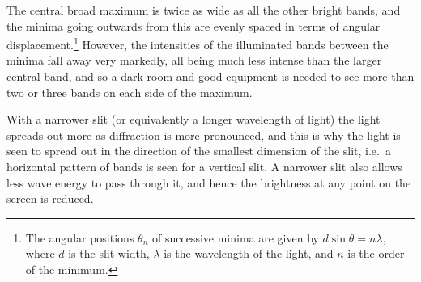 \noindent{}\hspace{0em}

The central broad maximum is twice as wide as all the other bright bands, and the minima going outwards from this are evenly spaced in terms of angular displacement.\footnote{The angular positions $\theta_{n}$ of successive minima are given by $d\sin\theta=n\lambda$, where $d$ is the slit width, $\lambda$ is the wavelength of the light, and $n$ is the order of the minimum.}  However, the intensities of the illuminated bands between the minima fall away very markedly, all being much less intense than the larger central band, and so a dark room and good equipment is needed to see more than two or three bands on each side of the maximum.  

With a narrower slit (or equivalently a longer wavelength of light) the light spreads out more as diffraction is more pronounced, and this is why the light is seen to spread out in the direction of the smallest dimension of the slit, i.e.\ a horizontal pattern of bands is seen for a vertical slit.  A narrower slit also allows less wave energy to pass through it, and hence the brightness at any point on the screen is reduced.

